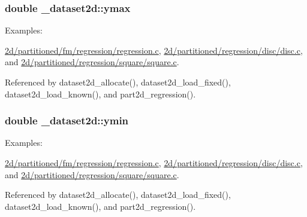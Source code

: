 \subsubsection[{\texorpdfstring{ymax}{ymax}}]{\setlength{\rightskip}{0pt plus 5cm}double \+\_\+dataset2d\+::ymax}\hypertarget{struct__dataset2d_a8ed0816f68228f5c1320629022cd28d2}{}\label{struct__dataset2d_a8ed0816f68228f5c1320629022cd28d2}
\begin{Desc}
\item[Examples\+: ]\par
\hyperlink{2d_2partitioned_2fm_2regression_2regression_8c-example}{2d/partitioned/fm/regression/regression.\+c}, \hyperlink{2d_2partitioned_2regression_2disc_2disc_8c-example}{2d/partitioned/regression/disc/disc.\+c}, and \hyperlink{2d_2partitioned_2regression_2square_2square_8c-example}{2d/partitioned/regression/square/square.\+c}.\end{Desc}


Referenced by dataset2d\+\_\+allocate(), dataset2d\+\_\+load\+\_\+fixed(), dataset2d\+\_\+load\+\_\+known(), and part2d\+\_\+regression().

\subsubsection[{\texorpdfstring{ymin}{ymin}}]{\setlength{\rightskip}{0pt plus 5cm}double \+\_\+dataset2d\+::ymin}\hypertarget{struct__dataset2d_acf2b4bf1e679fdeadf29f1a2257cbf27}{}\label{struct__dataset2d_acf2b4bf1e679fdeadf29f1a2257cbf27}
\begin{Desc}
\item[Examples\+: ]\par
\hyperlink{2d_2partitioned_2fm_2regression_2regression_8c-example}{2d/partitioned/fm/regression/regression.\+c}, \hyperlink{2d_2partitioned_2regression_2disc_2disc_8c-example}{2d/partitioned/regression/disc/disc.\+c}, and \hyperlink{2d_2partitioned_2regression_2square_2square_8c-example}{2d/partitioned/regression/square/square.\+c}.\end{Desc}


Referenced by dataset2d\+\_\+allocate(), dataset2d\+\_\+load\+\_\+fixed(), dataset2d\+\_\+load\+\_\+known(), and part2d\+\_\+regression().

